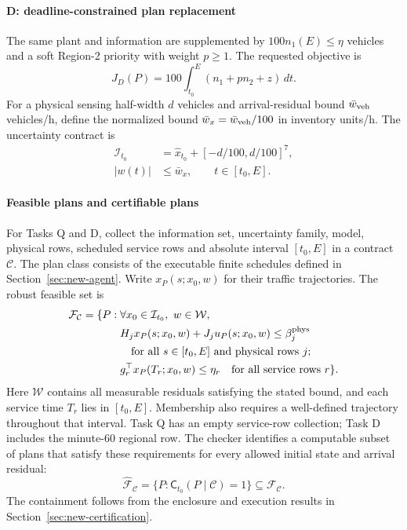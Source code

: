 \documentclass[journal,10pt]{IEEEtran}
\begin{document}
\paragraph{D: deadline-constrained plan replacement}
The same plant and information are supplemented by
$100n_1(E)\le\eta$ vehicles and a soft Region-2 priority with weight
$p\ge1$. The requested objective is
\begin{equation}
J_D(P)=100\int_{t_0}^{E}(n_1+p n_2+z)\,dt.
\label{eq:benchmark-priority-cost}
\end{equation}
For a physical sensing half-width $d$ vehicles and arrival-residual bound
$\bar w_{\rm veh}$ vehicles/h, define the normalized bound
$\bar w_x=\bar w_{\rm veh}/100$ in inventory units/h. The uncertainty
contract is
\begin{equation}
\begin{aligned}
\mathcal I_{t_0}&=\widehat x_{t_0}+[-d/100,d/100]^7,\\
|w(t)|&\le\bar w_x,\qquad t\in[t_0,E].
\end{aligned}
\label{eq:benchmark-contract}
\end{equation}
\paragraph{Feasible plans and certifiable plans}
For Tasks Q and D, collect the information set, uncertainty family, model,
physical rows, scheduled service rows and absolute interval $[t_0,E]$ in a
contract $\mathcal C$. The plan class consists of the executable finite
schedules defined in Section~\ref{sec:new-agent}. Write
$x_P(s;x_0,w)$ for their traffic trajectories. The robust feasible set is
\begin{equation}
\begin{aligned}
\mathcal F_{\mathcal C}=\{P:\;&\forall x_0\in\mathcal I_{t_0},\ w\in\mathcal W,\\
&H_jx_P(s;x_0,w)+J_ju_P(s;x_0,w)
                         \le\beta_j^{\rm phys}\\
&\hspace{1em}\text{for all }s\in[t_0,E]\text{ and physical rows }j;\\
&g_r^\top x_P(T_r;x_0,w)\le\eta_r
\quad\text{for all service rows }r\}.
\end{aligned}
\label{eq:benchmark-feasible-set}
\end{equation}
Here $\mathcal W$ contains all measurable residuals satisfying the stated
bound, and each service time $T_r$ lies in $[t_0,E]$. Membership also
requires a well-defined trajectory throughout that interval. Task Q has
an empty service-row collection; Task D includes the minute-60 regional
row. The checker identifies a computable subset of plans that satisfy these
requirements for every allowed initial state and arrival residual:
\begin{equation}
\widehat{\mathcal F}_{\mathcal C}
=\{P:\mathsf C_{t_0}(P\mid\mathcal C)=1\}
\subseteq\mathcal F_{\mathcal C}.
\label{eq:benchmark-certifiable-set}
\end{equation}
The containment follows from the enclosure and execution results in
Section~\ref{sec:new-certification}.
\end{document}
